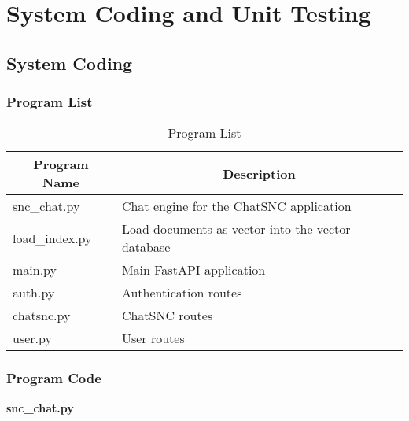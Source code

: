 

\chapter{System Coding and Unit Testing}

\section{System Coding}

\subsection{Program List}


\begin{table}[h!]
  \centering
  \caption{Program List}
  \vspace*{10pt}
  \begin{tabular}{|p{4cm}|p{8cm}|}
    \hline
    \multicolumn{1}{|c|}{\textbf{Program Name}} & \multicolumn{1}{c|}{\textbf{Description}}\\ \hline
    snc\_chat.py & Chat engine for the ChatSNC application\\ \hline
    load\_index.py & Load documents as vector into the vector database\\ \hline
    main.py & Main FastAPI application\\ \hline
    auth.py & Authentication routes\\ \hline
    chatsnc.py & ChatSNC routes\\ \hline
    user.py & User routes\\ \hline
  \end{tabular}
\end{table}

\subsection{Program Code}
  
\textbf{snc\_chat.py}

